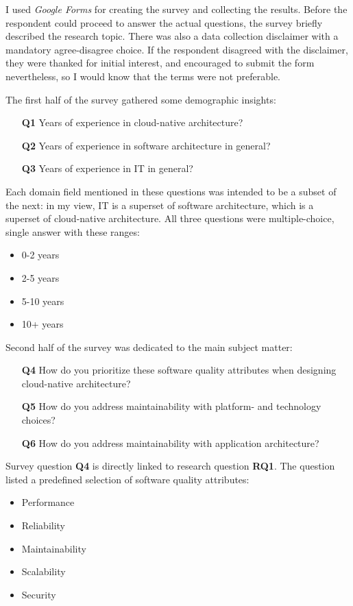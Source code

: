 \documentclass[utf8,english]{gradu3}
\begin{document}
I used \textit{Google Forms} for creating the survey and collecting the results.
Before the respondent could proceed to answer the actual questions, the survey
briefly described the research topic.  There was also a data collection
disclaimer with a mandatory agree-disagree choice.  If the respondent disagreed
with the disclaimer, they were thanked for initial interest, and encouraged to
submit the form nevertheless, so I would know that the terms were not
preferable.

The first half of the survey gathered some demographic insights:
\begin{enumerate}
  \item [\textbf{Q1}] Years of experience in cloud-native architecture?
  \item [\textbf{Q2}] Years of experience in software architecture in general?
  \item [\textbf{Q3}] Years of experience in IT in general?
\end{enumerate}

Each domain field mentioned in these questions was intended to be a subset of
the next: in my view, IT is a superset of software architecture, which is a
superset of cloud-native architecture.  All three questions were
multiple-choice, single answer with these ranges:
\begin{itemize}
  \item 0-2 years
  \item 2-5 years
  \item 5-10 years
  \item 10+ years
\end{itemize}

Second half of the survey was dedicated to the main subject matter:
\begin{enumerate}
  \item [\textbf{Q4}] How do you prioritize these software quality attributes
        when designing cloud-native architecture?
  \item [\textbf{Q5}] How do you address maintainability with platform- and
        technology choices?
  \item [\textbf{Q6}] How do you address maintainability with application
        architecture?
\end{enumerate}

Survey question \textbf{Q4} is directly linked to research question
\textbf{RQ1}.  The question listed a predefined selection of software quality
attributes:
\begin{itemize}
  \item Performance
  \item Reliability
  \item Maintainability
  \item Scalability
  \item Security
\end{itemize}
\end{document}
